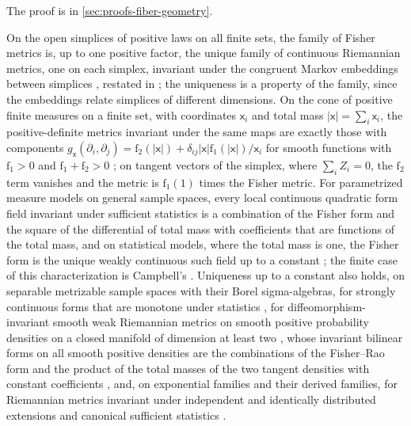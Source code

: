 The proof is in \cref{sec:proofs-fiber-geometry}.

On the open simplices of positive laws on all finite sets, the family of Fisher
metrics is, up to one positive factor, the unique family of continuous Riemannian
metrics, one on each simplex, invariant under the congruent Markov embeddings between
simplices \citep[Theorem~11.1]{Cencov1982}, restated in
\citet[Proposition~3.19(3)]{Ay2015}; the uniqueness is a property of the family,
since the embeddings relate simplices of different dimensions.  On the cone of positive finite measures on a
finite set, with coordinates $\mathsf x_i$ and total mass $|\mathsf x|=\sum_i\mathsf x_i$,
the positive-definite metrics invariant under the same maps are exactly those with
components $g_{\mathsf x}(\partial_i,\partial_j)=\mathrm f_2(|\mathsf x|)
+\delta_{ij}|\mathsf x|\mathrm f_1(|\mathsf x|)/\mathsf x_i$ for smooth functions with
$\mathrm f_1>0$ and $\mathrm f_1+\mathrm f_2>0$ \citep{Campbell1986}; on tangent vectors
of the simplex, where $\sum_iZ_i=0$, the $\mathrm f_2$ term vanishes and the metric is
$\mathrm f_1(1)$ times the Fisher metric.  For parametrized measure models on general
sample spaces, every local continuous quadratic form field invariant under sufficient
statistics is a combination of the Fisher form and the square of the differential of
total mass with coefficients that are functions of the total mass, and on statistical
models, where the total mass is one, the Fisher form is the unique weakly continuous such
field up to a constant \citep[Main Theorem~2.10 and Remark~3.23]{Ay2015}; the finite
case of this characterization is Campbell's \citep[Section~1]{Le2017}.  Uniqueness up
to a constant also holds, on separable metrizable sample spaces with their Borel
sigma-algebras, for strongly continuous forms that are monotone under statistics
\citep[Theorem~1.4]{Le2017}, for diffeomorphism-invariant smooth weak Riemannian metrics
on smooth positive probability densities on a closed manifold of dimension at least two
\citep[Theorem in the introduction]{BauerBruverisMichor2016}, whose invariant bilinear
forms on all smooth positive densities are the combinations of the Fisher--Rao form and
the product of the total masses of the two tangent densities with constant
coefficients \citep[Main Theorem]{BauerBruverisMichor2016}, and, on exponential
families and their derived families, for Riemannian metrics invariant under independent
and identically distributed extensions and canonical sufficient statistics
\citep[Theorem~1]{Dowty2018}.  

